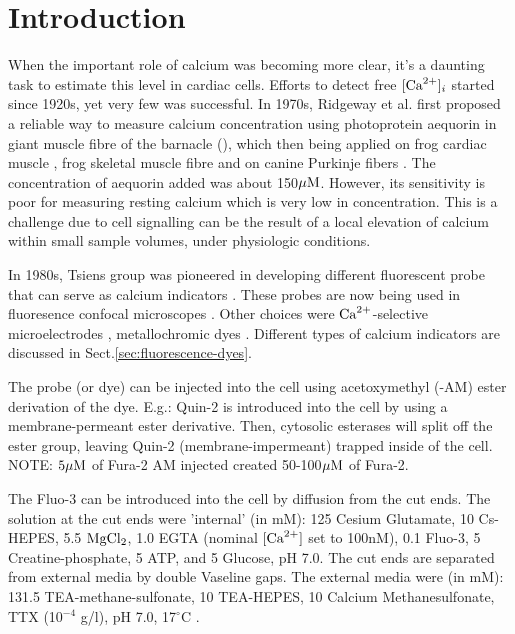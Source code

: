 \section{Introduction}
\label{sec:intro_measure-Ca-imaging}

When the important role of calcium was becoming more clear, it's a daunting task
to estimate this level in cardiac cells. Efforts to detect free $[{\text{Ca}^{2+}}]_i$
started since 1920s, yet very few was successful. In 1970s, Ridgeway et al.
first proposed a reliable way to measure calcium concentration using
photoprotein aequorin in giant muscle fibre of the barnacle
(\citep{ridgeway1976, ridgway1977}), which then being applied on frog cardiac
muscle \citep{allen1978}, frog skeletal muscle fibre \citep{blinks1978} and on
canine Purkinje fibers \citep{wier1980, wier1982}. The concentration of aequorin
added was about 150${\mu\text{M}}$. However, its sensitivity is poor for measuring
resting calcium which is very low in concentration. This is a challenge due to
cell signalling can be the result of a local elevation of calcium within
small sample volumes, under physiologic conditions.

In 1980s, Tsiens group was pioneered in developing different fluorescent probe
that can serve as calcium indicators
\citep{grynkiewicz1985,minta1989,tsien1989}. These probes are now being used in
fluoresence confocal microscopes \citep{baylor2000}. Other choices were
${\text{Ca}^{2+}}$-selective microelectrodes \citep{lopez1983}, metallochromic dyes
\citep{baylor1982}. Different types of calcium indicators are discussed in
Sect.\ref{sec:fluorescence-dyes}.

\begin{framed}
The probe (or dye) can be injected into the cell using acetoxymethyl (-AM) ester
derivation of the dye. E.g.: Quin-2 is introduced into the cell by
using a membrane-permeant ester derivative. Then, cytosolic esterases will split
off the ester group, leaving Quin-2 (membrane-impermeant) trapped inside of the
cell.  NOTE: $5{\mu\text{M}}$ of Fura-2 AM injected created 50-100${\mu\text{M}}$ of
Fura-2\citep{wier1987}.

The Fluo-3 can be introduced into the cell by diffusion from the cut ends. The
solution at the cut ends were 'internal' (in mM): 125 Cesium Glutamate, 10
Cs-HEPES, 5.5 $\ce{MgCl2}$, 1.0 EGTA (nominal $[{\text{Ca}^{2+}}]$ set to 100nM), 0.1
Fluo-3, 5 Creatine-phosphate, 5 ATP, and 5 Glucose, pH 7.0. The cut ends are
separated from external media by double Vaseline gaps. The external media were
(in mM): 131.5 TEA-methane-sulfonate, 10 TEA-HEPES, 10 Calcium Methanesulfonate,
TTX (10$^{-4}$ g/l), pH 7.0, 17$^\circ$C \citep{cheng1999}.
\end{framed}

